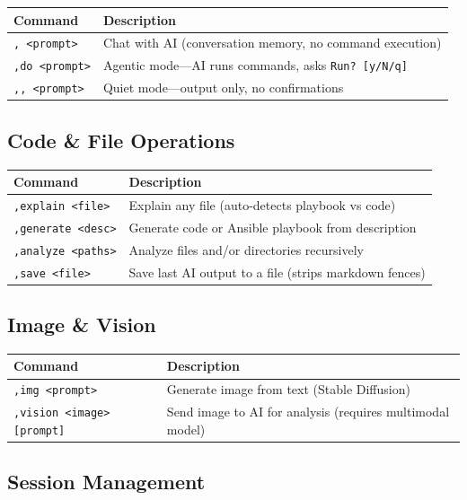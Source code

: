 \documentclass[11pt,a4paper]{article}
\begin{document}
\begin{longtable}{p{4.5cm}p{9cm}}
\toprule
\textbf{Command} & \textbf{Description} \\
\midrule
\texttt{, <prompt>} & Chat with AI (conversation memory, no command execution) \\
\texttt{,do <prompt>} & Agentic mode---AI runs commands, asks \texttt{Run? [y/N/q]} \\
\texttt{,, <prompt>} & Quiet mode---output only, no confirmations \\
\bottomrule
\end{longtable}

\subsection{Code \& File Operations}

\begin{longtable}{p{4.5cm}p{9cm}}
\toprule
\textbf{Command} & \textbf{Description} \\
\midrule
\texttt{,explain <file>} & Explain any file (auto-detects playbook vs code) \\
\texttt{,generate <desc>} & Generate code or Ansible playbook from description \\
\texttt{,analyze <paths>} & Analyze files and/or directories recursively \\
\texttt{,save <file>} & Save last AI output to a file (strips markdown fences) \\
\bottomrule
\end{longtable}

\subsection{Image \& Vision}

\begin{longtable}{p{5cm}p{8.5cm}}
\toprule
\textbf{Command} & \textbf{Description} \\
\midrule
\texttt{,img <prompt>} & Generate image from text (Stable Diffusion) \\
\texttt{,vision <image> [prompt]} & Send image to AI for analysis (requires multimodal model) \\
\bottomrule
\end{longtable}

\subsection{Session Management}
\end{document}
